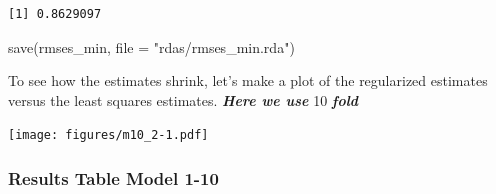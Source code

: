 \documentclass[
]{article}
\newenvironment{Shaded}{}{}
\newcommand{\AttributeTok}[1]{\textcolor[rgb]{0.49,0.56,0.16}{#1}}
\newcommand{\FunctionTok}[1]{\textcolor[rgb]{0.02,0.16,0.49}{#1}}
\newcommand{\NormalTok}[1]{#1}
\newcommand{\OtherTok}[1]{\textcolor[rgb]{0.00,0.44,0.13}{#1}}
\newcommand{\SpecialCharTok}[1]{\textcolor[rgb]{0.25,0.44,0.63}{#1}}
\newcommand{\StringTok}[1]{\textcolor[rgb]{0.25,0.44,0.63}{#1}}
\begin{document}
\begin{Shaded}
\end{Shaded}

\begin{verbatim}
[1] 0.8629097
\end{verbatim}

\begin{Shaded}
\begin{Highlighting}[]
\FunctionTok{save}\NormalTok{(rmses\_min, }\AttributeTok{file =} \StringTok{"rdas/rmses\_min.rda"}\NormalTok{)}
\end{Highlighting}
\end{Shaded}

\newpage

To see how the estimates shrink, let's make a plot of the regularized
estimates versus the least squares estimates. \textbf{\emph{Here we
use}} 10 \textbf{\emph{fold}}

\texttt{[image: figures/m10\_2-1.pdf]}

\newpage

\hypertarget{results-table-model-1-10}{%
\subsubsection{Results Table Model
1-10}\label{results-table-model-1-10}}
\end{document}

